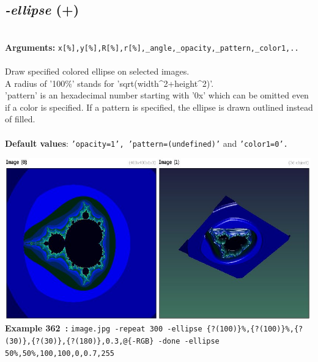 \documentclass[a4paper,11pt,twoside]{book}
\begin{document}
\subsection{\emph{-ellipse} (+)}\vspace*{-0.5em}
~\\\textbf{Arguments: } 
{\small \texttt{x[\%],y[\%],R[\%],r[\%],\_angle,\_opacity,\_pattern,\_color1,..}}\\~\\
Draw specified colored ellipse on selected images.
~\\A radius of '100\%' stands for 'sqrt(width\textasciicircum 2+height\textasciicircum 2)'.
~\\'pattern' is an hexadecimal number starting with '0x' which can be omitted
even if a color is specified. If a pattern is specified, the ellipse is
drawn outlined instead of filled.
~\\~\\\textbf{Default values}: {\small \texttt{'opacity=1', 'pattern=(undefined)'} and \texttt{'color1=0'.}}
\begin{center}\includegraphics[keepaspectratio=true,height=7cm,width=\textwidth]{img/gmic_def362.jpg}\\
{\footnotesize \textbf{Example 362~:} \texttt{image.jpg -repeat 300 -ellipse \{?(100)\}\%,\{?(100)\}\%,\{?(30)\},\{?(30)\},\{?(180)\},0.3,@\{-RGB\} -done -ellipse 50\%,50\%,100,100,0,0.7,255}}
\end{center}
\end{document}
